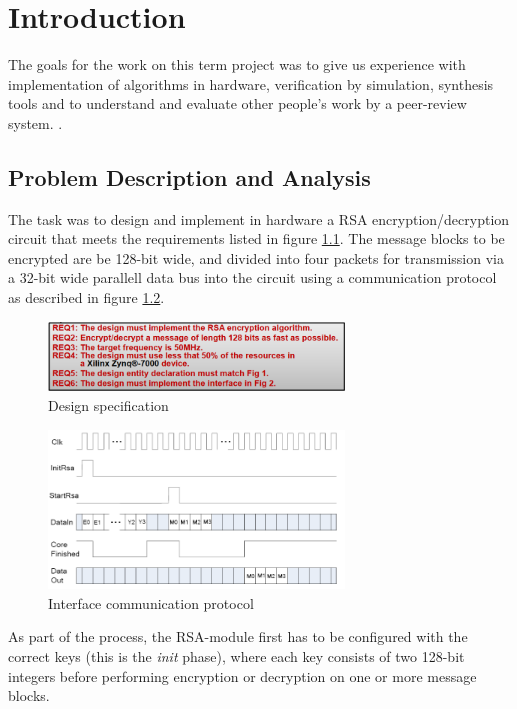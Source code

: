 \chapter{Introduction}
The goals for the work on this term project was to give us experience with implementation of algorithms in hardware, verification by simulation, synthesis tools and to understand and evaluate other people's work by a peer-review system. \cite{ggmanual}.\cite{rsahardware}
\section{Problem Description and Analysis} %


The task was to design and implement in hardware a RSA encryption/decryption circuit that meets the requirements listed in figure \ref{fig:req}. The message blocks to be encrypted are be 128-bit wide, and divided into four packets for transmission via a 32-bit wide parallell data bus into the circuit using a communication protocol as described in figure \ref{fig:interface}. 
\begin{figure}[H]
\centering
\includegraphics[width=0.7\textwidth]{images/requierements.PNG}
\caption{Design specification}
\label{fig:req}
\end{figure}
\begin{figure}[H]
\centering
\includegraphics[width=0.7\textwidth]{images/communication.PNG}
\caption{Interface communication protocol}
\label{fig:interface}
\end{figure}

As part of the process, the RSA-module first has to be configured with the correct keys (this is the \emph{init} phase), where each key consists of two 128-bit integers before performing encryption or decryption on one or more message blocks.
